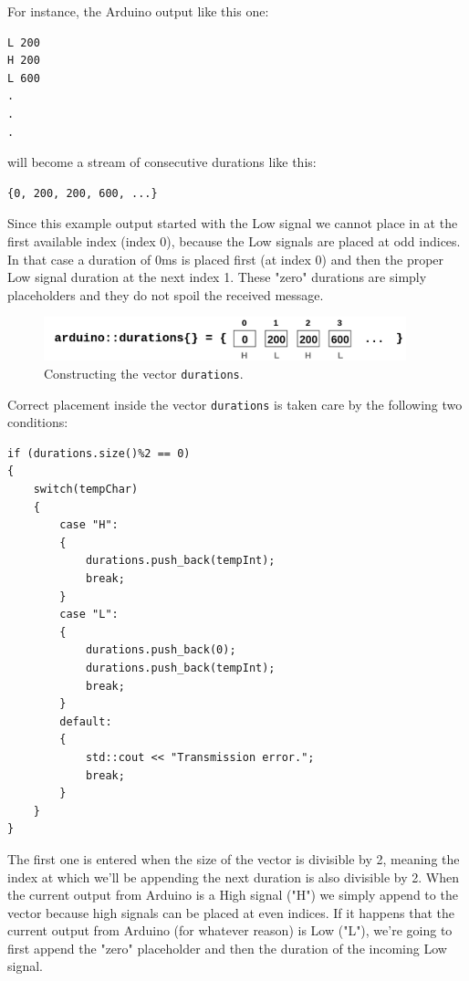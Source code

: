 \documentclass[12pt]{report}
\begin{document}
For instance, the Arduino output like this one:

\begin{snugshade}
\begin{verbatim}
L 200
H 200
L 600
.
.
.
\end{verbatim}
\end{snugshade}

will become a stream of consecutive durations like this:

\begin{snugshade}
\begin{verbatim}
{0, 200, 200, 600, ...}
\end{verbatim}
\end{snugshade}

Since this example output started with the Low signal we cannot place in at the first available index (index 0), because the Low signals are placed at odd indices. In that case a duration of 0ms is placed first (at index 0) and then the proper Low signal duration at the next index 1. These "zero" durations are simply placeholders and they do not spoil the received message.

\begin{figure}[H]
\centering\includegraphics[width=10.5cm]{durations.png}
\caption{Constructing the vector \texttt{durations}.}				
\label{fig:timedur}
\end{figure}

Correct placement inside the vector \texttt{durations} is taken care by the following two conditions:

\begin{lstlisting}
if (durations.size()%2 == 0)
{
	switch(tempChar)
	{
		case "H":
		{
			durations.push_back(tempInt);
			break;
		}
		case "L":
		{
			durations.push_back(0);
			durations.push_back(tempInt);
			break;
		}
		default:
		{
			std::cout << "Transmission error.";
			break;
		}
	}
}
\end{lstlisting}

The first one is entered when the size of the vector is divisible by 2, meaning the index at which we'll be appending the next duration is also divisible by 2. When the current output from Arduino is a High signal ("H") we simply append to the vector because high signals can be placed at even indices. If it happens that the current output from Arduino (for whatever reason) is Low ("L"), we're going to first append the "zero" placeholder and then the duration of the incoming Low signal.
\end{document}
